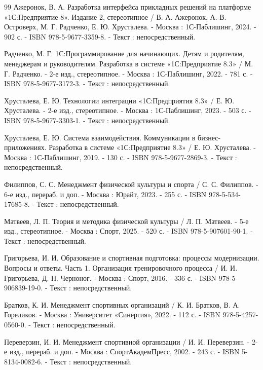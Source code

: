 \begin{thebibliography}{99}
	 Ажеронок, В. А. Разработка интерфейса прикладных решений на платформе «1С:Предприятие 8». Издание 2, стереотипное / В. А. Ажеронок, А. В. Островерх, М. Г. Радченко, Е. Ю. Хрусталева. - Москва : 1С-Паблишинг, 2024. - 902 с. - ISBN 978-5-9677-3359-8. - Текст : непосредственный. 
	
	 Радченко, М. Г. 1С:Программирование для начинающих. Детям и родителям, менеджерам и руководителям. Разработка в системе «1С:Предприятие 8.3» / М. Г. Радченко. - 2-е изд., стереотипное. - Москва : 1С-Паблишинг, 2022. - 781 с. - ISBN 978-5-9677-3172-3. - Текст : непосредственный.
	
	 Хрусталева, Е. Ю. Технологии интеграции «1С:Предприятия 8.3» / Е. Ю. Хрусталева. - 2-е изд., стереотипное. - Москва : 1С-Паблишинг, 2023. - 503 с. - ISBN 978-5-9677-3303-1. - Текст : непосредственный.
	
	 Хрусталева, Е. Ю. Система взаимодействия. Коммуникации в бизнес-приложениях. Разработка в системе «1С:Предприятие 8.3» / Е. Ю. Хрусталева. - Москва : 1С-Паблишинг, 2019. - 130 с. - ISBN 978-5-9677-2869-3. - Текст : непосредственный.
	
	
	
	
	 Филиппов, С. С. Менеджмент физической культуры и спорта / С. С. Филиппов. - 6-е изд., перераб. и доп. - Москва : Юрайт, 2023. - 255 с. - ISBN 978-5-534-17685-8. - Текст : непосредственный.
	
	 Матвеев, Л. П. Теория и методика физической культуры / Л. П. Матвеев. - 5-е изд., стереотипное. - Москва : Спорт, 2025. - 520 с. - ISBN 978-5-907601-90-1. - Текст : непосредственный.
	
	 Григорьева, И. И. Образование и спортивная подготовка: процессы модернизации. Вопросы и ответы. Часть 1. Организация тренировочного процесса / И. И. Григорьева, Д. Н. Черноног. - Москва : Спорт, 2016. - 336 с. - ISBN 978-5-906839-19-0. - Текст : непосредственный.
	
	 Братков, К. И. Менеджмент спортивных организаций / К. И. Братков, В. А. Гореликов. - Москва : Университет «Синергия», 2022. - 112 с. - ISBN 978-5-4257-0560-0. - Текст : непосредственный.
	
	 Переверзин, И. И. Менеджмент спортивной организации / И. И. Переверзин. - 2-е изд., перераб. и доп. - Москва : СпортАкадемПресс, 2002. - 243 с. - ISBN 5-8134-0082-6. - Текст : непосредственный.
	

\end{thebibliography}
